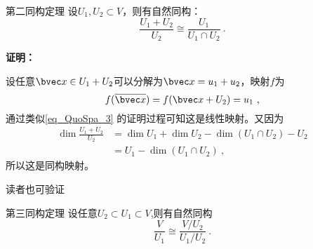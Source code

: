\begin{theorem}{第二同构定理}
设$U_1,U_2\subset V$，则有自然同构：
\begin{equation}
\frac{U_1+U_2}{U_2}\cong \frac{U_1}{U_1\cap U_2}~.
\end{equation}
\end{theorem}
\textbf{证明：}

设任意$\bvec x\in U_1+U_2$可以分解为$\bvec x=u_1+u_2$，映射$f$为
\begin{equation}
f(\overline {\bvec x})=f(\bvec x+U_2)=u_1~,
\end{equation}
通过类似\autoref{eq_QuoSpa_3} 的证明过程可知这是线性映射。又因为
\begin{equation}
\begin{aligned}
\dim\frac{U_1+U_2}{U_2}&=\dim U_1+\dim U_2-\dim (U_1\cap U_2)-U_2\\
&=U_1-\dim(U_1\cap U_2)~,
\end{aligned}
\end{equation}
所以这是同构映射。

读者也可验证

\begin{theorem}{第三同构定理}
设任意$U_2\subset U_1\subset V$,则有自然同构
\begin{equation}
\frac{V}{U_1}\cong \frac{V/U_2}{U_1/U_2}~.
\end{equation}

\end{theorem}
\begin{corollary}{}

\end{corollary}







